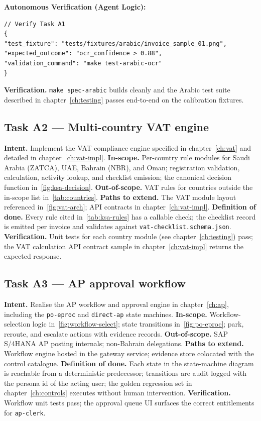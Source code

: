 \documentclass[11pt,a4paper,twoside]{report}
\begin{document}
\textbf{Autonomous Verification (Agent Logic):}
\begin{lstlisting}[language=jsonx]
// Verify Task A1
{
"test_fixture": "tests/fixtures/arabic/invoice_sample_01.png",
"expected_outcome": "ocr_confidence > 0.88",
"validation_command": "make test-arabic-ocr"
}
\end{lstlisting}

\textbf{Verification.} \texttt{make spec-arabic} builds cleanly and
the Arabic test suite described in chapter~\ref{ch:testing} passes
end-to-end on the calibration fixtures.

\subsection*{Task A2 --- Multi-country VAT engine}
\textbf{Intent.} Implement the VAT compliance engine specified in
chapter~\ref{ch:vat} and detailed in chapter~\ref{ch:vat-impl}.
\textbf{In-scope.} Per-country rule modules for Saudi Arabia (ZATCA),
UAE, Bahrain (NBR), and Oman; registration validation, calculation,
activity lookup, and checklist emission; the canonical decision
function in~\ref{fig:ksa-decision}.
\textbf{Out-of-scope.} VAT rules for countries outside the in-scope
list in~\ref{tab:countries}.
\textbf{Paths to extend.} The VAT module layout referenced
in~\ref{fig:vat-arch}; API contracts in chapter~\ref{ch:vat-impl}.
\textbf{Definition of done.} Every rule cited
in~\ref{tab:ksa-rules} has a callable check; the checklist record is
emitted per invoice and validates against
\texttt{vat-checklist.schema.json}.
\textbf{Verification.} Unit tests for each country module (see
chapter~\ref{ch:testing}) pass; the VAT calculation API contract
sample in chapter~\ref{ch:vat-impl} returns the expected response.

\subsection*{Task A3 --- AP approval workflow}
\textbf{Intent.} Realise the AP workflow and approval engine in
chapter~\ref{ch:ap}, including the \texttt{po-eproc} and
\texttt{direct-ap} state machines.
\textbf{In-scope.} Workflow-selection logic in~\ref{fig:workflow-select};
state transitions in~\ref{fig:po-eproc}; park, reroute, and escalate
actions with evidence records.
\textbf{Out-of-scope.} SAP S/4HANA AP posting internals;
non-Bahrain delegations.
\textbf{Paths to extend.} Workflow engine hosted in the gateway
service; evidence store colocated with the control catalogue.
\textbf{Definition of done.} Each state in the state-machine diagram
is reachable from a deterministic predecessor; transitions are audit
logged with the persona id of the acting user; the golden regression
set in chapter~\ref{ch:controls} executes without human intervention.
\textbf{Verification.} Workflow unit tests pass; the approval queue
UI surfaces the correct entitlements for \texttt{ap-clerk}.
\end{document}
